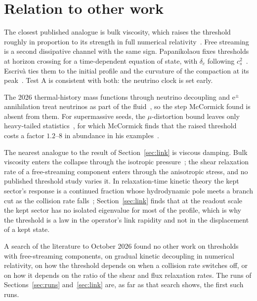 \documentclass[11pt]{article}
\begin{document}
\section{Relation to other work}

The closest published analogue is bulk viscosity, which raises the threshold roughly in proportion to its strength in full numerical relativity~\cite{Yuwen}. Free streaming is a second dissipative channel with the same sign. Papanikolaou fixes thresholds at horizon crossing for a time-dependent equation of state, with $\delta_c$ following $c_s^2$~\cite{Pap}. Escriv\`a ties them to the initial profile and the curvature of the compaction at its peak~\cite{Esc}. Test A is consistent with both: the neutrino clock is set early.

The 2026 thermal-history mass functions through neutrino decoupling and e$^\pm$ annihilation treat neutrinos as part of the fluid~\cite{Gonin}, so the step McCormick found is absent from them. For supermassive seeds, the $\mu$-distortion bound leaves only heavy-tailed statistics~\cite{Dave}, for which McCormick finds that the raised threshold costs a factor $1.2$--$8$ in abundance in his examples~\cite{McC}.

The nearest analogue to the result of Section~\ref{sec:link} is viscous damping. Bulk viscosity enters the collapse through the isotropic pressure~\cite{Yuwen}; the shear relaxation rate of a free-streaming component enters through the anisotropic stress, and no published threshold study varies it. In relaxation-time kinetic theory the kept sector's response is a continued fraction whose hydrodynamic pole meets a branch cut as the collision rate falls~\cite{Rom,Hu}; Section~\ref{sec:link} finds that at the readout scale the kept sector has no isolated eigenvalue for most of the profile, which is why the threshold is a law in the operator's link rapidity and not in the displacement of a kept state.

A search of the literature to October 2026 found no other work on thresholds with free-streaming components, on gradual kinetic decoupling in numerical relativity, on how the threshold depends on when a collision rate switches off, or on how it depends on the ratio of the shear and flux relaxation rates. The runs of Sections~\ref{sec:runs} and~\ref{sec:link} are, as far as that search shows, the first such runs.
\end{document}

